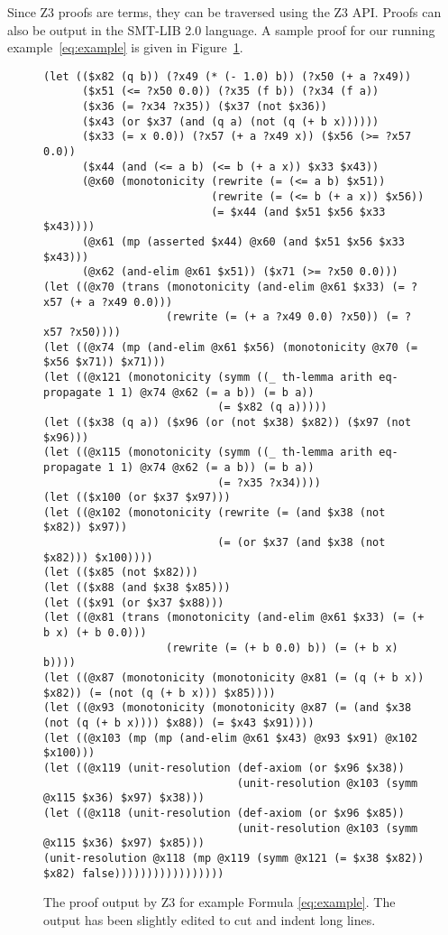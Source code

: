 \documentclass{llncs}
\begin{document}
Since Z3 proofs are terms, they can be traversed using the Z3 API.
Proofs can also be output in the SMT-LIB 2.0 language. A sample proof
for our running example~\ref{eq:example} is given in
Figure~\ref{fig:proofz3}.

\begin{figure}
{\scriptsize
\begin{verbatim}
(let (($x82 (q b)) (?x49 (* (- 1.0) b)) (?x50 (+ a ?x49))
      ($x51 (<= ?x50 0.0)) (?x35 (f b)) (?x34 (f a))
      ($x36 (= ?x34 ?x35)) ($x37 (not $x36))
      ($x43 (or $x37 (and (q a) (not (q (+ b x))))))
      ($x33 (= x 0.0)) (?x57 (+ a ?x49 x)) ($x56 (>= ?x57 0.0))
      ($x44 (and (<= a b) (<= b (+ a x)) $x33 $x43))
      (@x60 (monotonicity (rewrite (= (<= a b) $x51))
                          (rewrite (= (<= b (+ a x)) $x56))
                          (= $x44 (and $x51 $x56 $x33 $x43))))
      (@x61 (mp (asserted $x44) @x60 (and $x51 $x56 $x33 $x43)))
      (@x62 (and-elim @x61 $x51)) ($x71 (>= ?x50 0.0)))
(let ((@x70 (trans (monotonicity (and-elim @x61 $x33) (= ?x57 (+ a ?x49 0.0)))
                   (rewrite (= (+ a ?x49 0.0) ?x50)) (= ?x57 ?x50))))
(let ((@x74 (mp (and-elim @x61 $x56) (monotonicity @x70 (= $x56 $x71)) $x71)))
(let ((@x121 (monotonicity (symm ((_ th-lemma arith eq-propagate 1 1) @x74 @x62 (= a b)) (= b a))
                           (= $x82 (q a)))))
(let (($x38 (q a)) ($x96 (or (not $x38) $x82)) ($x97 (not $x96)))
(let ((@x115 (monotonicity (symm ((_ th-lemma arith eq-propagate 1 1) @x74 @x62 (= a b)) (= b a))
                           (= ?x35 ?x34))))
(let (($x100 (or $x37 $x97)))
(let ((@x102 (monotonicity (rewrite (= (and $x38 (not $x82)) $x97))
                           (= (or $x37 (and $x38 (not $x82))) $x100))))
(let (($x85 (not $x82)))
(let (($x88 (and $x38 $x85)))
(let (($x91 (or $x37 $x88)))
(let ((@x81 (trans (monotonicity (and-elim @x61 $x33) (= (+ b x) (+ b 0.0)))
                   (rewrite (= (+ b 0.0) b)) (= (+ b x) b))))
(let ((@x87 (monotonicity (monotonicity @x81 (= (q (+ b x)) $x82)) (= (not (q (+ b x))) $x85))))
(let ((@x93 (monotonicity (monotonicity @x87 (= (and $x38 (not (q (+ b x)))) $x88)) (= $x43 $x91))))
(let ((@x103 (mp (mp (and-elim @x61 $x43) @x93 $x91) @x102 $x100)))
(let ((@x119 (unit-resolution (def-axiom (or $x96 $x38))
                              (unit-resolution @x103 (symm @x115 $x36) $x97) $x38)))
(let ((@x118 (unit-resolution (def-axiom (or $x96 $x85))
                              (unit-resolution @x103 (symm @x115 $x36) $x97) $x85)))
(unit-resolution @x118 (mp @x119 (symm @x121 (= $x38 $x82)) $x82) false)))))))))))))))))
\end{verbatim}
}
\caption{\label{fig:proofz3} The proof output by Z3 for example Formula \ref{eq:example}. The output has been slightly edited to cut and indent long lines.}
\end{figure}
\end{document}
